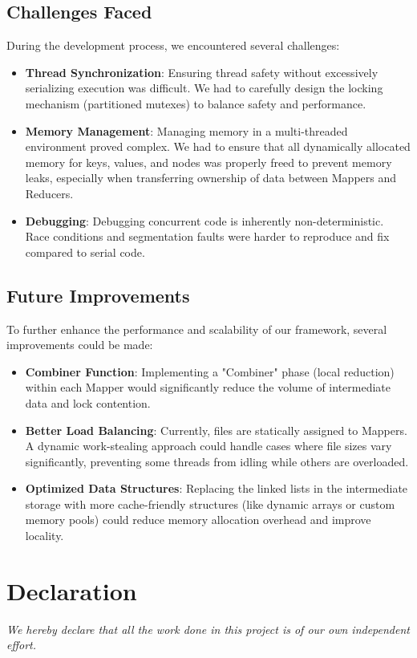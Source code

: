 \documentclass[a4paper,12pt]{article}
\begin{document}
\subsection{Challenges Faced}
During the development process, we encountered several challenges:
\begin{itemize}
    \item \textbf{Thread Synchronization}: Ensuring thread safety without excessively serializing execution was difficult. We had to carefully design the locking mechanism (partitioned mutexes) to balance safety and performance.
    \item \textbf{Memory Management}: Managing memory in a multi-threaded environment proved complex. We had to ensure that all dynamically allocated memory for keys, values, and nodes was properly freed to prevent memory leaks, especially when transferring ownership of data between Mappers and Reducers.
    \item \textbf{Debugging}: Debugging concurrent code is inherently non-deterministic. Race conditions and segmentation faults were harder to reproduce and fix compared to serial code.
\end{itemize}

\subsection{Future Improvements}
To further enhance the performance and scalability of our framework, several improvements could be made:
\begin{itemize}
    \item \textbf{Combiner Function}: Implementing a "Combiner" phase (local reduction) within each Mapper would significantly reduce the volume of intermediate data and lock contention.
    \item \textbf{Better Load Balancing}: Currently, files are statically assigned to Mappers. A dynamic work-stealing approach could handle cases where file sizes vary significantly, preventing some threads from idling while others are overloaded.
    \item \textbf{Optimized Data Structures}: Replacing the linked lists in the intermediate storage with more cache-friendly structures (like dynamic arrays or custom memory pools) could reduce memory allocation overhead and improve locality.
\end{itemize}

\section{Declaration}
\textit{We hereby declare that all the work done in this project is of our own independent effort.}
\end{document}
